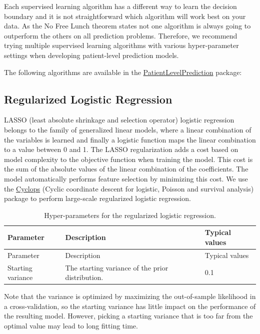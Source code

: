\documentclass[11pt]{book}
\theoremstyle{definition}
\theoremstyle{definition}
\theoremstyle{definition}
\theoremstyle{remark}
\begin{document}
Each supervised learning algorithm has a different way to learn the
decision boundary and it is not straightforward which algorithm will
work best on your data. As the No Free Lunch theorem states not one
algorithm is always going to outperform the others on all prediction
problems. Therefore, we recommend trying multiple
supervised learning algorithms with various hyper-parameter settings
when developing patient-level prediction models.

The following algorithms are available in the
\href{https://ohdsi.github.io/PatientLevelPrediction/}{PatientLevelPrediction}
package:

\subsection{Regularized Logistic
Regression}\label{regularized-logistic-regression}

LASSO (least absolute shrinkage and selection operator) logistic
regression belongs to the family of generalized linear models, where a
linear combination of the variables is learned and finally a logistic
function maps the linear combination to a value between 0 and 1. The
LASSO regularization adds a cost based on model complexity to the
objective function when training the model. This cost is the sum of the
absolute values of the linear combination of the coefficients. The model
automatically performs feature selection by minimizing this cost. We use
the \href{https://ohdsi.github.io/Cyclops/}{Cyclops} (Cyclic coordinate
descent for logistic, Poisson and survival analysis) package to perform
large-scale regularized logistic regression. 
  

\begin{longtable}[]{@{}lll@{}}
\caption{\label{tab:lassoParameters} Hyper-parameters for the regularized
logistic regression.}\tabularnewline
\toprule
Parameter & Description & Typical values\tabularnewline
\midrule
\endfirsthead
\toprule
Parameter & Description & Typical values\tabularnewline
\midrule
\endhead
Starting variance & The starting variance of the prior distribution. &
0.1\tabularnewline
\bottomrule
\end{longtable}

Note that the variance is optimized by maximizing the out-of-sample
likelihood in a cross-validation, so the starting variance has little
impact on the performance of the resulting model. However, picking a
starting variance that is too far from the optimal value may lead to
long fitting time.  
\end{document}
